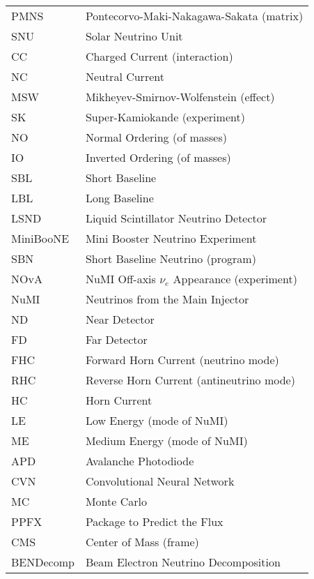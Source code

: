 \documentclass[12pt,a4paper]{report}
\begin{document}
\begin{table}[H]
\begin{tabular}{ll}
PMNS       & Pontecorvo-Maki-Nakagawa-Sakata (matrix)          \\
SNU        & Solar Neutrino Unit                               \\
CC         & Charged Current (interaction)                     \\
NC         & Neutral Current                                   \\
MSW        & Mikheyev-Smirnov-Wolfenstein (effect)             \\
SK         & Super-Kamiokande (experiment)                     \\
NO         & Normal Ordering (of masses)                       \\
IO         & Inverted Ordering (of masses)                     \\
SBL        & Short Baseline                                    \\
LBL        & Long Baseline                                     \\
LSND       & Liquid Scintillator Neutrino Detector             \\
MiniBooNE  & Mini Booster Neutrino Experiment                  \\
SBN        & Short Baseline Neutrino (program)                 \\
NOvA       & NuMI Off-axis $\nu_e$ Appearance (experiment)     \\
NuMI       & Neutrinos from the Main Injector                  \\
ND         & Near Detector                                     \\
FD         & Far Detector                                      \\
FHC        & Forward Horn Current (neutrino mode)              \\
RHC        & Reverse Horn Current (antineutrino mode)          \\
HC         & Horn Current                                      \\
LE         & Low Energy (mode of NuMI)                         \\
ME         & Medium Energy (mode of NuMI)                      \\
APD        & Avalanche Photodiode                              \\
CVN        & Convolutional Neural Network                      \\
MC         & Monte Carlo                                       \\
PPFX       & Package to Predict the Flux                       \\
CMS        & Center of Mass (frame)                            \\
BENDecomp  & Beam Electron Neutrino Decomposition              
\end{tabular}
\end{table}
\end{document}
